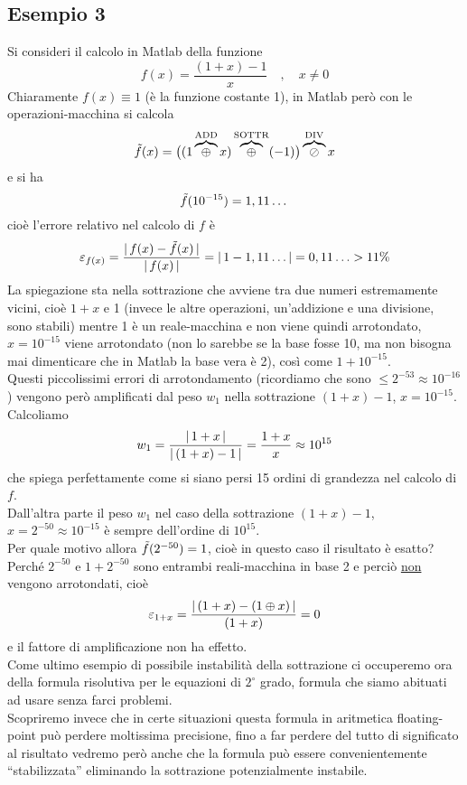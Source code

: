 \subsection{Esempio 3}
Si consideri il calcolo in Matlab della funzione
\[f(x) = \frac{(1+x)-1}{x} \quad , \quad x \ne 0\]
Chiaramente $f(x) \equiv 1$ (è la funzione costante 1), in Matlab però con le operazioni-macchina si calcola 
\[\Tilde{f}(x) = \bigl( (1 \overbrace{\oplus}^{\text{ADD}} x) \overbrace{\oplus}^{\text{SOTTR}} (-1) \bigr) \overbrace{\oslash}^{\text{DIV}} x\]
e si ha \[\Tilde{f}(10^{-15}) = 1,11 \dotsc\] 
cioè l'errore relativo nel calcolo di $f$ è
\[\varepsilon_{f(x)} = \frac{\lvert\,f(x) - \Tilde{f}(x)\,\rvert}{\lvert\,f(x)\,\rvert} = \lvert\,1 - 1,11 \dotsc\,\rvert = 0,11 \dotsc > 11\%\]
La spiegazione sta nella sottrazione che avviene tra due numeri estremamente vicini, cioè $1 + x$  e  1 (invece le altre operazioni, un'addizione e una divisione, sono stabili) mentre 1 è un reale-macchina e non viene quindi arrotondato, $x=10^{-15}$ viene arrotondato (non lo sarebbe se la base fosse 10, ma non bisogna mai dimenticare che in Matlab la base vera è 2), così come $1 + 10^{-15}$.\\
Questi piccolissimi errori di arrotondamento (ricordiamo che sono $\le 2^{-53} \approx 10^{-16}$) vengono però amplificati dal peso $w_1$ nella sottrazione $(1 + x) - 1$, $x = 10^{-15}$.\\
Calcoliamo
\[w_1 = \frac{\lvert\,1+x\,\rvert}{\lvert\,(1+x)-1\,\rvert} = \frac{1+x}{x} \approx 10^{15}\]
che spiega perfettamente come si siano persi 15 ordini di grandezza nel calcolo di $f$.\\
Dall'altra parte il peso $w_1$ nel caso della sottrazione $(1+x)-1$, $x=2^{-50} \approx 10^{-15}$ è sempre dell'ordine di $10^{15}$.\\
Per quale motivo allora $\Tilde{f}(2^{-50}) = 1$, cioè in questo caso il risultato è esatto?\\
Perché $2^{-50}$ e $1+2^{-50}$ sono entrambi reali-macchina in base 2 e perciò \uline{non} vengono arrotondati, cioè 
\[\varepsilon_{1+x} = \frac{\lvert\,(1+x)-(1\oplus x)\,\rvert}{(1+x)} = 0\]
e il fattore di amplificazione non ha effetto.\\

Come ultimo esempio di possibile instabilità della sottrazione ci occuperemo ora della formula risolutiva per le equazioni di $2^\circ$ grado, formula che siamo abituati ad usare senza farci problemi.\\
Scopriremo invece che in certe situazioni questa formula in aritmetica floating-point può perdere moltissima precisione, fino a far perdere del tutto di significato al risultato vedremo però anche che la formula può essere convenientemente “stabilizzata” eliminando la sottrazione potenzialmente instabile.


